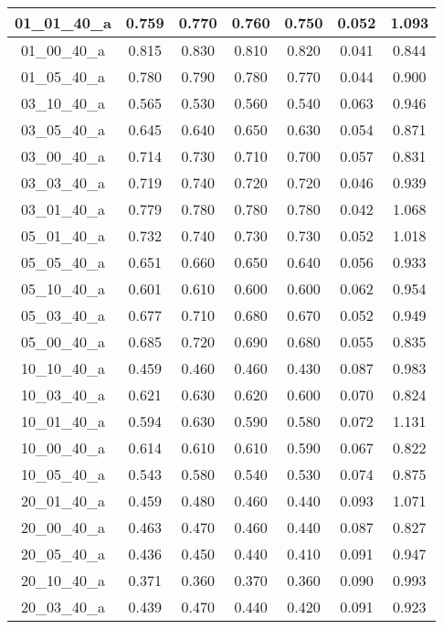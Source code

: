 \begin{table}[H]
{\begin{tabular}{|c|c|c|c|c|c|c|}
01\_01\_40\_a 	& 0.759 	& 0.770 	& 0.760 	& 0.750 	& 0.052 	& 1.093 	 \\ \hline
01\_00\_40\_a 	& 0.815 	& 0.830 	& 0.810 	& 0.820 	& 0.041 	& 0.844 	 \\ \hline
01\_05\_40\_a 	& 0.780 	& 0.790 	& 0.780 	& 0.770 	& 0.044 	& 0.900 	 \\ \hline
03\_10\_40\_a 	& 0.565 	& 0.530 	& 0.560 	& 0.540 	& 0.063 	& 0.946 	 \\ \hline
03\_05\_40\_a 	& 0.645 	& 0.640 	& 0.650 	& 0.630 	& 0.054 	& 0.871 	 \\ \hline
03\_00\_40\_a 	& 0.714 	& 0.730 	& 0.710 	& 0.700 	& 0.057 	& 0.831 	 \\ \hline
03\_03\_40\_a 	& 0.719 	& 0.740 	& 0.720 	& 0.720 	& 0.046 	& 0.939 	 \\ \hline
03\_01\_40\_a 	& 0.779 	& 0.780 	& 0.780 	& 0.780 	& 0.042 	& 1.068 	 \\ \hline
05\_01\_40\_a	& 0.732 	& 0.740 	& 0.730 	& 0.730 	& 0.052 	& 1.018 	 \\ \hline
05\_05\_40\_a 	& 0.651 	& 0.660 	& 0.650 	& 0.640 	& 0.056 	& 0.933 	 \\ \hline
05\_10\_40\_a 	& 0.601 	& 0.610 	& 0.600 	& 0.600		& 0.062 	& 0.954 	 \\ \hline
05\_03\_40\_a 	& 0.677 	& 0.710 	& 0.680 	& 0.670 	& 0.052 	& 0.949 	 \\ \hline
05\_00\_40\_a 	& 0.685 	& 0.720 	& 0.690 	& 0.680 	& 0.055 	& 0.835 	 \\ \hline
10\_10\_40\_a 	& 0.459 	& 0.460 	& 0.460 	& 0.430 	& 0.087 	& 0.983 	 \\ \hline
10\_03\_40\_a	& 0.621 	& 0.630 	& 0.620 	& 0.600 	& 0.070 	& 0.824 	 \\ \hline
10\_01\_40\_a 	& 0.594 	& 0.630 	& 0.590 	& 0.580 	& 0.072 	& 1.131 	 \\ \hline
10\_00\_40\_a 	& 0.614 	& 0.610 	& 0.610 	& 0.590 	& 0.067 	& 0.822 	 \\ \hline
10\_05\_40\_a 	& 0.543 	& 0.580 	& 0.540 	& 0.530 	& 0.074 	& 0.875 	 \\ \hline
20\_01\_40\_a 	& 0.459 	& 0.480 	& 0.460 	& 0.440 	& 0.093 	& 1.071 	 \\ \hline
20\_00\_40\_a 	& 0.463 	& 0.470 	& 0.460 	& 0.440 	& 0.087 	& 0.827 	 \\ \hline
20\_05\_40\_a 	& 0.436 	& 0.450 	& 0.440 	& 0.410 	& 0.091 	& 0.947 	 \\ \hline
20\_10\_40\_a 	& 0.371 	& 0.360 	& 0.370 	& 0.360 	& 0.090 	& 0.993 	 \\ \hline
20\_03\_40\_a	& 0.439 	& 0.470 	& 0.440 	& 0.420 	& 0.091 	& 0.923 	 \\ \hline
\end{tabular}
}
\end{table}

